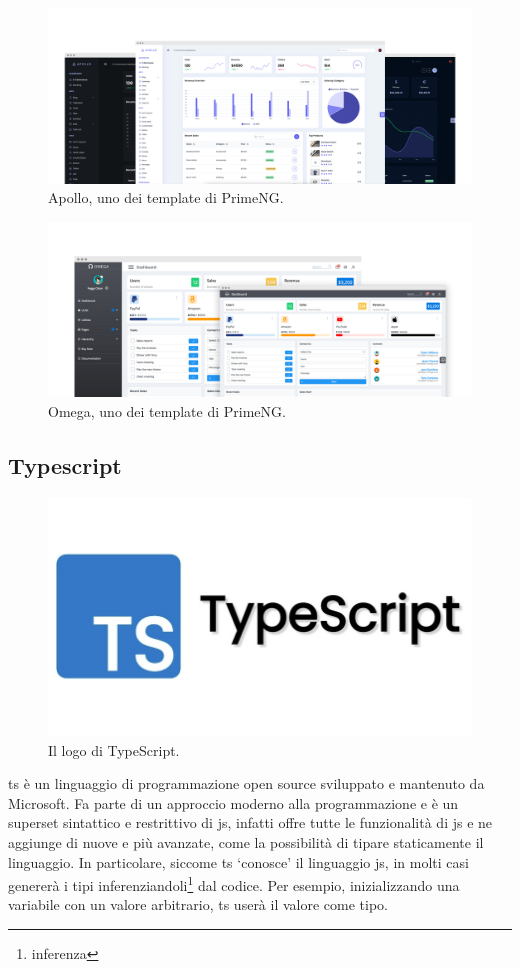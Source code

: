 \begin{figure}[H]
\centering
\includegraphics[width=1\textwidth]{Images/apollo.png}
\caption{\label{fig:apollo}Apollo, uno dei template di PrimeNG.}
\end{figure}
\begin{figure}[H]
\centering
\includegraphics[width=1\textwidth]{Images/omega.png}
\caption{\label{fig:omega}Omega, uno dei template di PrimeNG.}
\end{figure}

\newpage
\subsection{Typescript}\label{sec:Typescript}
\begin{figure}[H]
\centering
\includegraphics[width=.7\textwidth]{Images/ts.png}
\caption{\label{fig:logo ts}Il logo di TypeScript.}
\end{figure}
\acrfull{ts} è un linguaggio di programmazione \gls{open source} sviluppato e mantenuto da Microsoft. Fa parte di un approccio moderno alla programmazione e è un superset sintattico e restrittivo di \acrlong{js}, infatti offre tutte le funzionalità di \acrlong{js} e ne aggiunge di nuove e più avanzate, come la possibilità di tipare staticamente il linguaggio. In particolare, siccome \acrlong{ts} `conosce' il linguaggio \acrlong{js}, in molti casi genererà i tipi inferenziandoli\footnote{\glsdesc{inferenza}} dal codice. Per esempio, inizializzando una variabile con un valore arbitrario, \acrlong{ts} userà il valore come tipo. 


